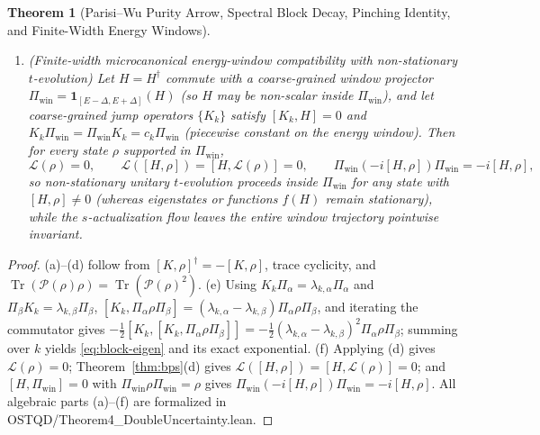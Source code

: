 \documentclass[11pt,a4paper]{article}
\newtheorem{theorem}{Theorem}
\theoremstyle{definition}
\theoremstyle{remark}
\newcommand{\Tr}{\operatorname{Tr}}
\newcommand{\cL}{\mathcal{L}}
\newcommand{\cP}{\mathcal{P}}
\newcommand{\1}{\mathbf{1}}
\newcommand{\normF}[1]{\|#1\|_F}
\newcommand{\code}[1]{{\footnotesize\ttfamily #1}}
\begin{document}
\begin{theorem}[Parisi--Wu Purity Arrow, Spectral Block Decay, Pinching Identity, and Finite-Width Energy Windows]
\begin{enumerate}
\begin{equation}
  \end{equation}
  Consequently, $e^{s\cL}(\Pi_\alpha\rho\Pi_\beta) = \exp\!\bigl[-\frac{s}{2}\sum_k(\lambda_{k,\alpha}-\lambda_{k,\beta})^2\bigr]\Pi_\alpha\rho\Pi_\beta$. Whenever the eigenvalue tuples $(\lambda_{k,\alpha})_k$ separate distinct sectors ($\forall \alpha\neq\beta, \exists k, \lambda_{k,\alpha}\neq\lambda_{k,\beta}$), the exact long-time limit is $\lim_{s\to\infty} e^{s\cL}(\rho) = \cP(\rho)$, identifying $\normF{\rho-\cP(\rho)}^2$ in \eqref{eq:pythagorean} precisely with the coherence destroyed by the $s$-flow.
  \item[(f)] \emph{(Finite-width microcanonical energy-window compatibility with non-stationary $t$-evolution)} Let $H = H^\dagger$ commute with a coarse-grained window projector $\Pi_{\mathrm{win}} = \1_{[E-\Delta, E+\Delta]}(H)$ (so $H$ may be \emph{non-scalar} inside $\Pi_{\mathrm{win}}$), and let coarse-grained jump operators $\{K_k\}$ satisfy $[K_k, H] = 0$ and $K_k\Pi_{\mathrm{win}} = \Pi_{\mathrm{win}}K_k = c_k\Pi_{\mathrm{win}}$ (piecewise constant on the energy window). Then for every state $\rho$ supported in $\Pi_{\mathrm{win}}$,
  \begin{equation}\label{eq:window-compat}
    \cL(\rho) = 0, \qquad \cL([H,\rho]) = [H,\cL(\rho)] = 0, \qquad \Pi_{\mathrm{win}}(-i[H,\rho])\Pi_{\mathrm{win}} = -i[H,\rho],
  \end{equation}
  so non-stationary unitary $t$-evolution proceeds inside $\Pi_{\mathrm{win}}$ for any state with $[H,\rho] \neq 0$ (whereas eigenstates or functions $f(H)$ remain stationary), while the $s$-actualization flow leaves the entire window trajectory pointwise invariant.
\end{enumerate}
\end{theorem}

\begin{proof}
(a)--(d) follow from $[K,\rho]^\dagger = -[K,\rho]$, trace cyclicity, and $\Tr(\cP(\rho)\rho) = \Tr(\cP(\rho)^2)$.
(e) Using $K_k\Pi_\alpha = \lambda_{k,\alpha}\Pi_\alpha$ and $\Pi_\beta K_k = \lambda_{k,\beta}\Pi_\beta$, $[K_k, \Pi_\alpha\rho\Pi_\beta] = (\lambda_{k,\alpha}-\lambda_{k,\beta})\Pi_\alpha\rho\Pi_\beta$, and iterating the commutator gives $-\frac{1}{2}[K_k,[K_k,\Pi_\alpha\rho\Pi_\beta]] = -\frac{1}{2}(\lambda_{k,\alpha}-\lambda_{k,\beta})^2 \Pi_\alpha\rho\Pi_\beta$; summing over $k$ yields \eqref{eq:block-eigen} and its exact exponential.
(f) Applying (d) gives $\cL(\rho) = 0$; Theorem~\ref{thm:bps}(d) gives $\cL([H,\rho]) = [H,\cL(\rho)] = 0$; and $[H,\Pi_{\mathrm{win}}]=0$ with $\Pi_{\mathrm{win}}\rho\Pi_{\mathrm{win}}=\rho$ gives $\Pi_{\mathrm{win}}(-i[H,\rho])\Pi_{\mathrm{win}} = -i[H,\rho]$. All algebraic parts (a)--(f) are formalized in \code{OSTQD/Theorem4\_DoubleUncertainty.lean}.
\end{proof}
\end{document}
